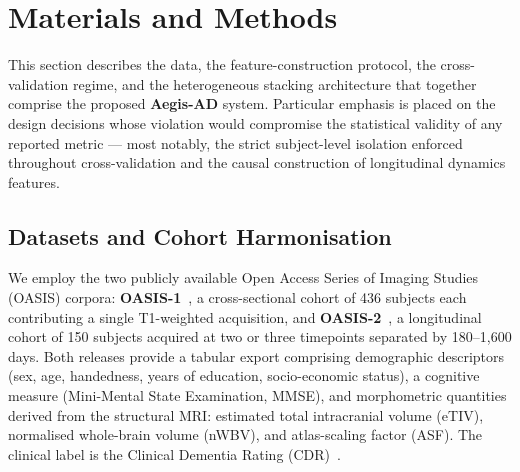 %
%

\section{Materials and Methods}
\label{sec:methods}

This section describes the data, the feature-construction protocol, the cross-validation regime, and the heterogeneous stacking architecture that together comprise the proposed \textbf{Aegis-AD} system. Particular emphasis is placed on the design decisions whose violation would compromise the statistical validity of any reported metric --- most notably, the strict subject-level isolation enforced throughout cross-validation and the causal construction of longitudinal dynamics features.

\subsection{Datasets and Cohort Harmonisation}
\label{subsec:data}

We employ the two publicly available Open Access Series of Imaging Studies (OASIS) corpora: \textbf{OASIS-1}~\cite{marcus2007oasis}, a cross-sectional cohort of 436 subjects each contributing a single T1-weighted acquisition, and \textbf{OASIS-2}~\cite{marcus2010oasis2}, a longitudinal cohort of 150 subjects acquired at two or three timepoints separated by 180--1{,}600 days. Both releases provide a tabular export comprising demographic descriptors (sex, age, handedness, years of education, socio-economic status), a cognitive measure (Mini-Mental State Examination, MMSE), and morphometric quantities derived from the structural MRI: estimated total intracranial volume (eTIV), normalised whole-brain volume (nWBV), and atlas-scaling factor (ASF). The clinical label is the Clinical Dementia Rating (CDR)~\cite{morris1993cdr}.

